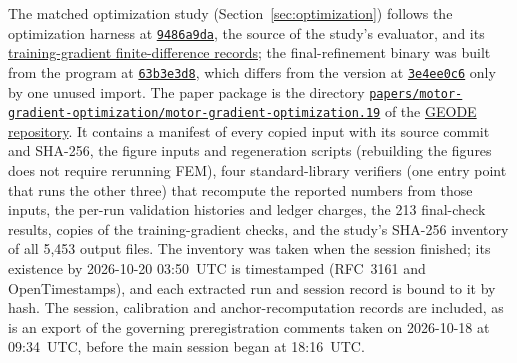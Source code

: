 \documentclass{anvil-paper}
\begin{document}
\begin{sloppypar}
The matched optimization study (Section~\ref{sec:optimization}) follows the
optimization harness at
\href{https://github.com/rjwalters/geode-fem/tree/9486a9da58beeca91968d4d3608f06b998abff45/benchmarks/motor_optimization}{\texttt{9486a9da}},
the source of the study's evaluator, and its
\href{https://github.com/rjwalters/geode-fem/tree/9486a9da58beeca91968d4d3608f06b998abff45/benchmarks/motor_optimization/runs}{training-gradient finite-difference records};
the final-refinement binary was built from the program at
\href{https://github.com/rjwalters/geode-fem/blob/63b3e3d8bbc30504f845eebb5b78e8be6a2ee12f/crates/geode-core/examples/icem_final_refinement.rs}{\texttt{63b3e3d8}},
which differs from the version at
\href{https://github.com/rjwalters/geode-fem/blob/3e4ee0c63a86dbf014a76c9faf04dd962da16911/crates/geode-core/examples/icem_final_refinement.rs}{\texttt{3e4ee0c6}}
only by one unused import.
The paper package is the directory
\href{https://github.com/rjwalters/geode-fem/tree/main/papers/motor-gradient-optimization/motor-gradient-optimization.19}{\texttt{papers/}\allowbreak\texttt{motor-gradient-optimization/}\allowbreak\texttt{motor-gradient-optimization.19}}
of the \href{https://github.com/rjwalters/geode-fem}{GEODE repository}. It
contains a manifest of every copied input with its source commit and
SHA-256, the figure inputs and regeneration scripts (rebuilding the figures
does not require rerunning FEM), four standard-library verifiers (one
entry point that runs the other three) that recompute the reported numbers
from those inputs, the per-run validation
histories and ledger charges, the 213 final-check results, copies of the
training-gradient checks, and the study's SHA-256 inventory of all 5,453
output files. The inventory was taken when the session finished; its
existence by 2026-10-20 03:50~UTC is timestamped (RFC~3161 and
OpenTimestamps), and each extracted run and session record is bound to it
by hash. The session, calibration and anchor-recomputation records are
included, as is an export of the governing preregistration comments taken
on 2026-10-18 at 09:34~UTC, before the main session began at 18:16~UTC.
\end{sloppypar}
\end{document}
